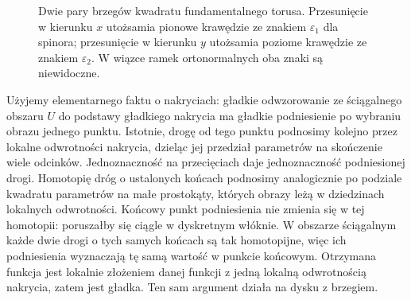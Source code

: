 \begin{figure}[!htbp]
\centering
{}
\caption{Dwie pary brzegów kwadratu fundamentalnego torusa.
Przesunięcie w kierunku $x$ utożsamia pionowe krawędzie
ze znakiem $\varepsilon_1$ dla spinora; przesunięcie w kierunku
$y$ utożsamia poziome krawędzie ze znakiem $\varepsilon_2$.
W wiązce ramek ortonormalnych oba znaki są niewidoczne.}
\label{fig:spin-torus-signs}
\end{figure}

\begin{uwaga}
\label{rem:spin-podnoszenie}
Użyjemy elementarnego faktu o nakryciach: gładkie odwzorowanie
ze ściągalnego obszaru $U$ do podstawy gładkiego nakrycia ma
gładkie podniesienie po wybraniu obrazu jednego punktu.
Istotnie, drogę od tego punktu podnosimy kolejno przez lokalne
odwrotności nakrycia, dzieląc jej przedział parametrów na skończenie
wiele odcinków. Jednoznaczność na przecięciach daje jednoznaczność
podniesionej drogi. Homotopię dróg o ustalonych końcach podnosimy
analogicznie po podziale kwadratu parametrów na małe prostokąty,
których obrazy leżą w dziedzinach lokalnych odwrotności.
Końcowy punkt podniesienia nie zmienia się w tej homotopii:
poruszałby się ciągle w dyskretnym włóknie. W obszarze ściągalnym
każde dwie drogi o tych samych końcach są tak homotopijne,
więc ich podniesienia wyznaczają tę samą wartość w punkcie końcowym.
Otrzymana funkcja jest lokalnie złożeniem danej funkcji z jedną
lokalną odwrotnością nakrycia, zatem jest gładka.
Ten sam argument działa na dysku z brzegiem.
\end{uwaga}

